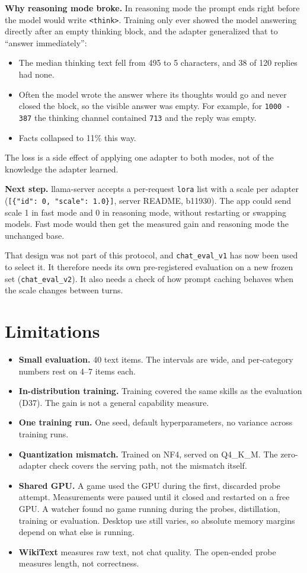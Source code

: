 \documentclass[11pt,a4paper]{article}
\newcommand{\code}[1]{\texttt{#1}}
\begin{document}
\textbf{Why reasoning mode broke.} In reasoning mode the prompt ends right before the model would write \code{<think>}. Training only ever showed the model answering directly after an empty thinking block, and the adapter generalized that to ``answer immediately'':

\begin{itemize}
\item The median thinking text fell from 495 to 5 characters, and 38 of 120 replies had none.
\item Often the model wrote the answer where its thoughts would go and never closed the block, so the visible answer was empty. For example, for \code{1000 - 387} the thinking channel contained \code{713} and the reply was empty.
\item Facts collapsed to 11\% this way.
\end{itemize}

The loss is a side effect of applying one adapter to both modes, not of the knowledge the adapter learned.

\textbf{Next step.} llama-server accepts a per-request \code{lora} list with a scale per adapter (\code{[\{"id": 0, "scale": 1.0\}]}, server README, b11930). The app could send scale 1 in fast mode and 0 in reasoning mode, without restarting or swapping models. Fast mode would then get the measured gain and reasoning mode the unchanged base.

That design was not part of this protocol, and \code{chat\_eval\_v1} has now been used to select it. It therefore needs its own pre-registered evaluation on a new frozen set (\code{chat\_eval\_v2}). It also needs a check of how prompt caching behaves when the scale changes between turns.

\section{Limitations}

\begin{itemize}
\item \textbf{Small evaluation.} 40 text items. The intervals are wide, and per-category numbers rest on 4--7 items each.
\item \textbf{In-distribution training.} Training covered the same skills as the evaluation (D37). The gain is not a general capability measure.
\item \textbf{One training run.} One seed, default hyperparameters, no variance across training runs.
\item \textbf{Quantization mismatch.} Trained on NF4, served on Q4\_K\_M. The zero-adapter check covers the serving path, not the mismatch itself.
\item \textbf{Shared GPU.} A game used the GPU during the first, discarded probe attempt. Measurements were paused until it closed and restarted on a free GPU. A watcher found no game running during the probes, distillation, training or evaluation. Desktop use still varies, so absolute memory margins depend on what else is running.
\item \textbf{WikiText} measures raw text, not chat quality. The open-ended probe measures length, not correctness.
\end{itemize}
\end{document}
